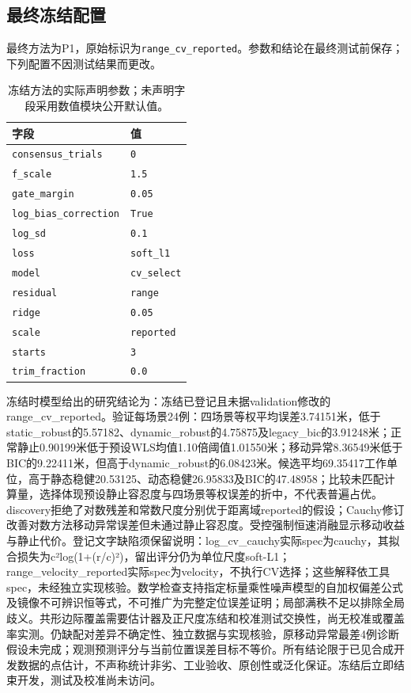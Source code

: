 \subsection{最终冻结配置}

最终方法为P1，原始标识为\texttt{range\_\allowbreak{}cv\_\allowbreak{}reported}。参数和结论在最终测试前保存；下列配置不因测试结果而更改。

\begin{table}[H]\centering\small
\caption{冻结方法的实际声明参数；未声明字段采用数值模块公开默认值。}

\begin{tabular}{ll}
\toprule
字段 & 值\\
\midrule
\texttt{consensus\_\allowbreak{}trials} & \texttt{0}\\
\texttt{f\_\allowbreak{}scale} & \texttt{1.5}\\
\texttt{gate\_\allowbreak{}margin} & \texttt{0.05}\\
\texttt{log\_\allowbreak{}bias\_\allowbreak{}correction} & \texttt{True}\\
\texttt{log\_\allowbreak{}sd} & \texttt{0.1}\\
\texttt{loss} & \texttt{soft\_\allowbreak{}l1}\\
\texttt{model} & \texttt{cv\_\allowbreak{}select}\\
\texttt{residual} & \texttt{range}\\
\texttt{ridge} & \texttt{0.05}\\
\texttt{scale} & \texttt{reported}\\
\texttt{starts} & \texttt{3}\\
\texttt{trim\_\allowbreak{}fraction} & \texttt{0.0}\\
\bottomrule\end{tabular}\end{table}

冻结时模型给出的研究结论为：冻结已登记且未据validation修改的range\_\allowbreak{}cv\_\allowbreak{}reported。验证每场景24例：四场景等权平均误差3.74151米，低于static\_\allowbreak{}robust的5.57182、dynamic\_\allowbreak{}robust的4.75875及legacy\_\allowbreak{}bic的3.91248米；正常静止0.90199米低于预设WLS均值1.10倍阈值1.01550米；移动异常8.36549米低于BIC的9.22411米，但高于dynamic\_\allowbreak{}robust的6.08423米。候选平均69.35417工作单位，高于静态稳健20.53125、动态稳健26.95833及BIC的47.48958；比较未匹配计算量，选择体现预设静止容忍度与四场景等权误差的折中，不代表普遍占优。discovery拒绝了对数残差和常数尺度分别优于距离域reported的假设；Cauchy修订改善对数方法移动异常误差但未通过静止容忍度。受控强制恒速消融显示移动收益与静止代价。登记文字缺陷须保留说明：log\_\allowbreak{}cv\_\allowbreak{}cauchy实际spec为cauchy，其拟合损失为c²log(1+(r/c)²)，留出评分仍为单位尺度soft-L1；range\_\allowbreak{}velocity\_\allowbreak{}reported实际spec为velocity，不执行CV选择；这些解释依工具spec，未经独立实现核验。数学检查支持指定标量乘性噪声模型的自加权偏差公式及镜像不可辨识恒等式，不可推广为完整定位误差证明；局部满秩不足以排除全局歧义。共形边际覆盖需要估计器及正尺度冻结和校准测试交换性，尚无校准或覆盖率实测。仍缺配对差异不确定性、独立数据与实现核验，原移动异常最差4例诊断假设未完成；观测预测评分与当前位置误差目标不等价。所有结论限于已见合成开发数据的点估计，不声称统计非劣、工业验收、原创性或泛化保证。冻结后立即结束开发，测试及校准尚未访问。